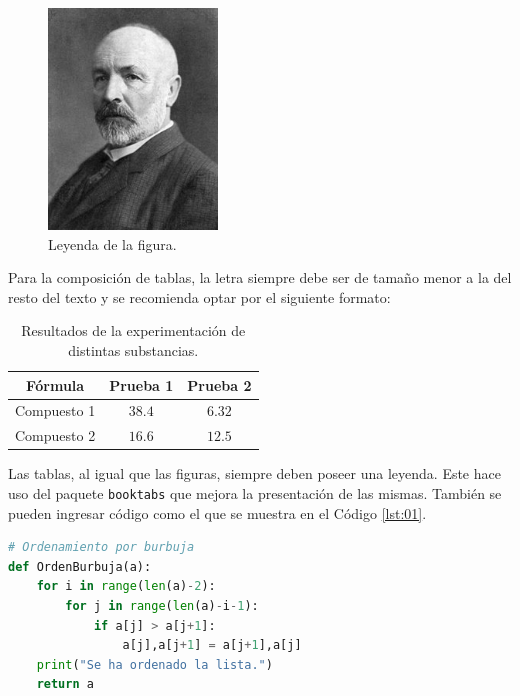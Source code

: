 \documentclass[11pt]{article}
\begin{document}
\begin{figure}[H]
    \centering
    \includegraphics[width=0.4\textwidth]{01 Figuras/fig01.jpg}
    \caption{Leyenda de la figura.}
    \label{fig:01}
\end{figure}

Para la composición de tablas, la letra siempre debe ser de tamaño menor a la del resto del texto y se recomienda optar por el siguiente formato:

\begin{table}[H]
    \centering\small
    \begin{tabular}{@{}ccc@{}}
    \toprule
        \textbf{Fórmula} & \textbf{Prueba 1} & \textbf{Prueba 2} \\ 
    \midrule
        Compuesto 1 & $38.4$  &  $6.32$\\ 
        Compuesto 2 & $16.6$ & $12.5$ \\ 
    \bottomrule
    \end{tabular}
    \caption{Resultados de la experimentación de distintas substancias.}
    \label{tab:01}
\end{table}

Las tablas, al igual que las figuras, siempre deben poseer una leyenda. Este hace uso del paquete \texttt{booktabs} que mejora la presentación de las mismas. También se pueden ingresar código como el que se muestra en el Código \ref{lst:01}.

\begin{lstlisting}[language=Python,caption={Ejemplo de código.},label={lst:01},captionpos=b]
# Ordenamiento por burbuja
def OrdenBurbuja(a):
    for i in range(len(a)-2):
        for j in range(len(a)-i-1):
            if a[j] > a[j+1]:
                a[j],a[j+1] = a[j+1],a[j]
    print("Se ha ordenado la lista.")
    return a
\end{lstlisting}
\end{document}

